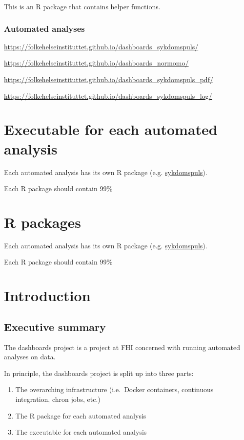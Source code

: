 \documentclass[12pt,]{article}
\providecommand{\tightlist}{%
  \setlength{\itemsep}{0pt}\setlength{\parskip}{0pt}}
\begin{document}
This is an R package that contains helper functions.

\subsubsection{Automated analyses}\label{automated-analyses}

\url{https://folkehelseinstituttet.github.io/dashboards_sykdomspuls/}

\url{https://folkehelseinstituttet.github.io/dashboards_normomo/}

\url{https://folkehelseinstituttet.github.io/dashboards_sykdomspuls_pdf/}

\url{https://folkehelseinstituttet.github.io/dashboards_sykdomspuls_log/}

\section{Executable for each automated
analysis}\label{executable-for-each-automated-analysis}

Each automated analysis has its own R package (e.g.
\href{https://github.com/folkehelseinstituttet/dashboards_sykdomspuls/}{sykdomspuls}).

Each R package should contain 99\%

\section{R packages}\label{r-packages}

Each automated analysis has its own R package (e.g.
\href{https://github.com/folkehelseinstituttet/dashboards_sykdomspuls/}{sykdomspuls}).

Each R package should contain 99\%

\section{Introduction}\label{intro}

\subsection{Executive summary}\label{executive-summary-1}

The dashboards project is a project at FHI concerned with running
automated analyses on data.

In principle, the dashboards project is split up into three parts:

\begin{enumerate}
\def\labelenumi{\arabic{enumi}.}
\tightlist
\item
  The overarching infrastructure (i.e.~Docker containers, continuous
  integration, chron jobs, etc.)
\item
  The R package for each automated analysis
\item
  The executable for each automated analysis
\end{enumerate}
\end{document}
